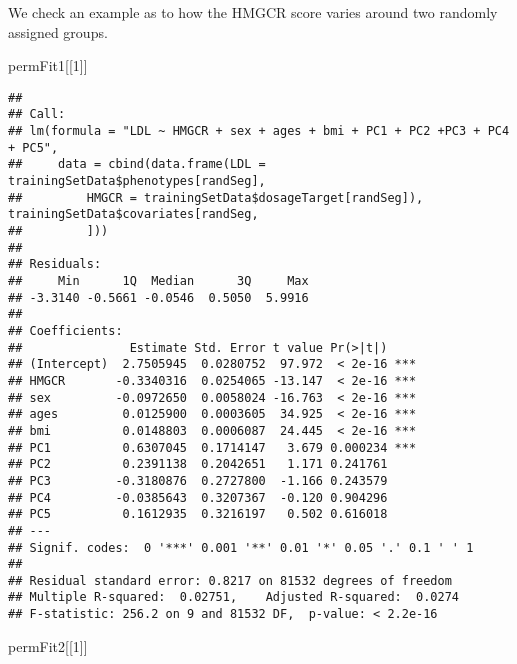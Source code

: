 \documentclass[]{article}
\newenvironment{Shaded}{\begin{snugshade}}{\end{snugshade}}
\newcommand{\DecValTok}[1]{\textcolor[rgb]{0.00,0.00,0.81}{#1}}
\newcommand{\NormalTok}[1]{#1}
\begin{document}
We check an example as to how the HMGCR score varies around two randomly
assigned groups.

\begin{Shaded}
\begin{Highlighting}[]
\NormalTok{permFit1[[}\DecValTok{1}\NormalTok{]]}
\end{Highlighting}
\end{Shaded}

\begin{verbatim}
## 
## Call:
## lm(formula = "LDL ~ HMGCR + sex + ages + bmi + PC1 + PC2 +PC3 + PC4 + PC5", 
##     data = cbind(data.frame(LDL = trainingSetData$phenotypes[randSeg], 
##         HMGCR = trainingSetData$dosageTarget[randSeg]), trainingSetData$covariates[randSeg, 
##         ]))
## 
## Residuals:
##     Min      1Q  Median      3Q     Max 
## -3.3140 -0.5661 -0.0546  0.5050  5.9916 
## 
## Coefficients:
##               Estimate Std. Error t value Pr(>|t|)    
## (Intercept)  2.7505945  0.0280752  97.972  < 2e-16 ***
## HMGCR       -0.3340316  0.0254065 -13.147  < 2e-16 ***
## sex         -0.0972650  0.0058024 -16.763  < 2e-16 ***
## ages         0.0125900  0.0003605  34.925  < 2e-16 ***
## bmi          0.0148803  0.0006087  24.445  < 2e-16 ***
## PC1          0.6307045  0.1714147   3.679 0.000234 ***
## PC2          0.2391138  0.2042651   1.171 0.241761    
## PC3         -0.3180876  0.2727800  -1.166 0.243579    
## PC4         -0.0385643  0.3207367  -0.120 0.904296    
## PC5          0.1612935  0.3216197   0.502 0.616018    
## ---
## Signif. codes:  0 '***' 0.001 '**' 0.01 '*' 0.05 '.' 0.1 ' ' 1
## 
## Residual standard error: 0.8217 on 81532 degrees of freedom
## Multiple R-squared:  0.02751,    Adjusted R-squared:  0.0274 
## F-statistic: 256.2 on 9 and 81532 DF,  p-value: < 2.2e-16
\end{verbatim}

\begin{Shaded}
\begin{Highlighting}[]
\NormalTok{permFit2[[}\DecValTok{1}\NormalTok{]]}
\end{Highlighting}
\end{Shaded}
\end{document}
